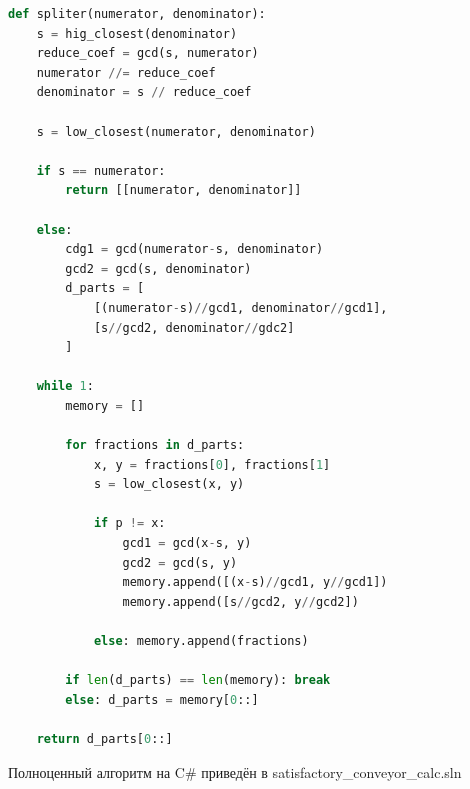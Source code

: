 \begin{lstlisting}[title={Python}, language={Python}]
def spliter(numerator, denominator):
	s = hig_closest(denominator)
	reduce_coef = gcd(s, numerator)
	numerator //= reduce_coef
	denominator = s // reduce_coef
	
	s = low_closest(numerator, denominator)
	
	if s == numerator:
		return [[numerator, denominator]]
	
	else:
		cdg1 = gcd(numerator-s, denominator)
		gcd2 = gcd(s, denominator)
		d_parts = [
			[(numerator-s)//gcd1, denominator//gcd1], 
			[s//gcd2, denominator//gdc2]
		]
	
	while 1:
		memory = []
	
		for fractions in d_parts:
			x, y = fractions[0], fractions[1]
			s = low_closest(x, y)
		
			if p != x:
				gcd1 = gcd(x-s, y)
				gcd2 = gcd(s, y)
				memory.append([(x-s)//gcd1, y//gcd1])
				memory.append([s//gcd2, y//gcd2])
			
			else: memory.append(fractions)
		
		if len(d_parts) == len(memory): break
		else: d_parts = memory[0::]
		
	return d_parts[0::]
\end{lstlisting}



\vspace{0.5in}

\noindent Полноценный алгоритм на C\# приведён в satisfactory\_conveyor\_calc.sln

































































